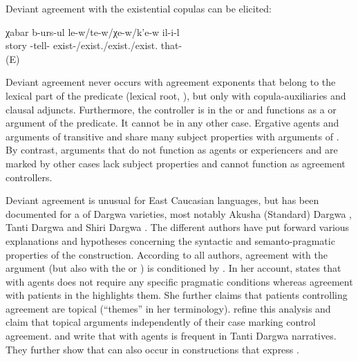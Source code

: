 Deviant agreement with the existential copulas can be elicited:

\begin{exe}
	\ex	\label{ex:telling a storyLOCCOP}
	\gll	χabar	b-urs-ul	le-w\slash		te-w\slash		χe-w\slash		k'e-w	il-i-l\\
		story	-tell-	exist-\slash 	exist.\slash 	exist.\slash	exist.	that-\\
	\glt	{} (E)
\end{exe}


Deviant agreement never occurs with agreement exponents that belong to the lexical part of the predicate (lexical root, ), but only with copula-auxiliaries and clausal adjuncts. Furthermore, the controller is in the  or  and functions as a  or  argument of the predicate. It cannot be in any other case. Ergative agents and   arguments of transitive and  share many subject properties with  arguments of  \citep{Forker2017, Forker2019}. By contrast, arguments that do not function as agents or experiencers and are marked by other cases lack subject properties and cannot function as agreement controllers.

Deviant agreement is unusual for East Caucasian languages, but has been documented for a  of Dargwa varieties, most notably Akusha (Standard) Dargwa \citep{vandenBerg1999, GanenkovForthcoming}, Tanti Dargwa \citep[450]{Sumbatova.Lander2014} and Shiri Dargwa \citep{Belyaev2016, Belyaev2017a, Belyaev2017b}. The different authors have put forward various explanations and hypotheses concerning the syntactic and semanto-pragmatic properties of the construction. According to all authors,  agreement with the  argument (but also with the  or ) is conditioned by . In her account, \citet{vandenBerg1999} states that  with  agents does not require any specific pragmatic conditions whereas agreement with patients in the  highlights them. She further claims that  patients controlling agreement are topical (``themes'' in her terminology). \citet{Sumbatova.Lander2014} refine this analysis and claim that topical arguments independently of their case marking control  agreement. \citet{Sumbatova2010} and \citet{Sumbatova.Lander2014} write that  with  agents is frequent in Tanti Dargwa narratives. They further show that  can also occur in  constructions that express .




